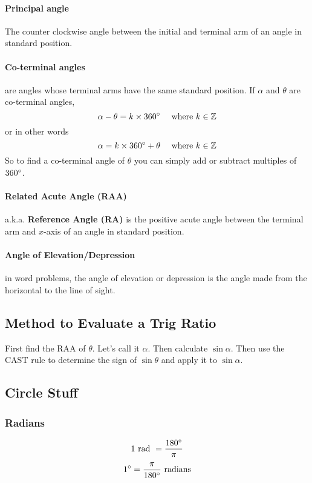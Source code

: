 \documentclass{article}
\numberwithin{equation}{section}
\begin{document}
\paragraph{Principal angle} The counter clockwise angle between the initial and terminal arm of an angle in standard position.
\paragraph{Co-terminal angles}
are angles whose terminal arms have the same standard position. If $\alpha$ and $\theta$ are co-terminal angles,
\begin{equation}
	\alpha - \theta = k \times 360 \degree \quad \textrm{ where } k \in \mathbb{Z}
\end{equation}
or in other words
\begin{equation}
	\alpha = k \times 360 \degree + \theta \quad \textrm{ where } k \in \mathbb{Z}
\end{equation}
So to find a co-terminal angle of $\theta$ you can simply add or subtract multiples of $360 \degree$.
\paragraph{Related Acute Angle (RAA)} a.k.a. \textbf{Reference Angle (RA)} is the positive acute angle between the terminal arm and $x$-axis of an angle in standard position.
\paragraph{Angle of Elevation/Depression}
in word problems, the angle of elevation or depression is the angle made from the horizontal to the line of sight.

\subsection{Method to Evaluate a Trig Ratio}
First find the RAA of $\theta$. Let's call it $\alpha$. Then calculate $\sin\alpha$. Then use the CAST rule to determine the sign of $\sin\theta$ and apply it to $\sin\alpha$.

\subsection{Circle Stuff}
\subsubsection{Radians}
\begin{equation}
	1 \textrm{ rad } = \frac{180 \degree}{\pi}
\end{equation}
\begin{equation}
	1 \degree = \frac{\pi}{180 \degree} \textrm{ radians}
\end{equation}
\end{document}
